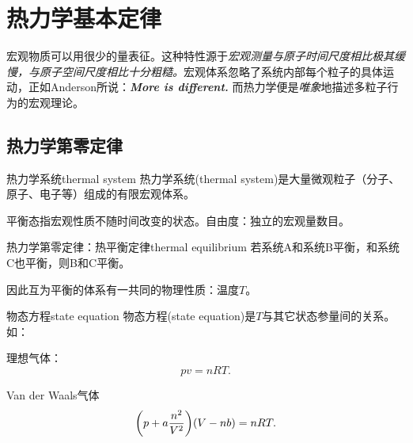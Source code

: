 \newcommand*{\sfas}{\mathfrak s}
\newcommand*{\lfas}{\mathfrak l}
\newcommand*{\gfas}{\mathfrak g}
\newcommand*{\crt}{\mathrm C}


\section{热力学基本定律}
宏观物质可以用很少的量表征。这种特性源于\textit{宏观测量与原子时间尺度相比极其缓慢，与原子空间尺度相比十分粗糙。}宏观体系忽略了系统内部每个粒子的具体运动，正如Anderson所说：\textbf{\textit{More is different.}}
而热力学便是\textit{唯象}地描述多粒子行为的宏观理论。
\subsection{热力学第零定律}
\begin{definition}{热力学系统}{thermal system}
	热力学系统(thermal system)是大量微观粒子（分子、原子、电子等）组成的有限宏观体系。
\end{definition}
平衡态指宏观性质不随时间改变的状态。自由度：独立的宏观量数目。
\begin{theorem}{热力学第零定律：热平衡定律}{thermal equilibrium}
	若系统A和系统B平衡，和系统C也平衡，则B和C平衡。
\end{theorem}
因此互为平衡的体系有一共同的物理性质：温度$T$。
\begin{definition}{物态方程}{state equation}
	物态方程(state equation)是$T$与其它状态参量间的关系。如：
	\begin{compactitem}
		\item 理想气体：
		\begin{equation}
			pv=nRT.
		\end{equation}
		\item Van der Waals气体
		\begin{equation}
			\biggl(p+a\frac{n^2}{V^2}\biggr)(V-nb)=nRT.
		\end{equation}
	\end{compactitem}
\end{definition}
